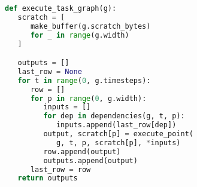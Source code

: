 \begin{lstlisting}[language=Python,caption={Excerpt from Dask implementation.\label{lst:code-sample}},float]
def execute_task_graph(g):
   scratch = [
      make_buffer(g.scratch_bytes)
      for _ in range(g.width)
   ]

   outputs = []
   last_row = None
   for t in range(0, g.timesteps):
      row = []
      for p in range(0, g.width):
         inputs = []
         for dep in dependencies(g, t, p):
            inputs.append(last_row[dep])
         output, scratch[p] = execute_point(
            g, t, p, scratch[p], *inputs)
         row.append(output)
         outputs.append(output)
      last_row = row
   return outputs
\end{lstlisting}
